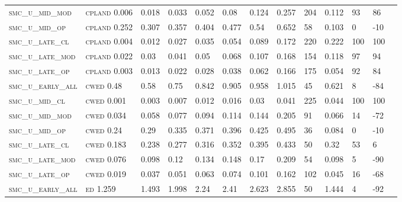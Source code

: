 \begin{landscape}
\begin{center}
\begin{footnotesize}
\begin{longtable}{lllllllllllll}
\textsc{smc\_u\_mid\_mod  } & \textsc{cpland    }   0.006    & 0.018    & 0.033    & 0.052    & 0.08     & 0.124    & 0.257    & 204  & 0.112    & 93  & 86   \\
\textsc{smc\_u\_mid\_op   } & \textsc{cpland    }   0.252    & 0.307    & 0.357    & 0.404    & 0.477    & 0.54     & 0.652    & 58   & 0.103    & 0   & -10  \\
\textsc{smc\_u\_late\_cl  } & \textsc{cpland    }   0.004    & 0.012    & 0.027    & 0.035    & 0.054    & 0.089    & 0.172    & 220  & 0.222    & 100 & 100  \\
\textsc{smc\_u\_late\_mod } & \textsc{cpland    }   0.022    & 0.03     & 0.041    & 0.05     & 0.068    & 0.107    & 0.168    & 154  & 0.118    & 97  & 94   \\
\textsc{smc\_u\_late\_op  } & \textsc{cpland    }   0.003    & 0.013    & 0.022    & 0.028    & 0.038    & 0.062    & 0.166    & 175  & 0.054    & 92  & 84   \\
\textsc{smc\_u\_early\_all} & \textsc{cwed      }   0.48     & 0.58     & 0.75     & 0.842    & 0.905    & 0.958    & 1.015    & 45   & 0.621    & 8   & -84  \\
\textsc{smc\_u\_mid\_cl   } & \textsc{cwed      }   0.001    & 0.003    & 0.007    & 0.012    & 0.016    & 0.03     & 0.041    & 225  & 0.044    & 100 & 100  \\
\textsc{smc\_u\_mid\_mod  } & \textsc{cwed      }   0.034    & 0.058    & 0.077    & 0.094    & 0.114    & 0.144    & 0.205    & 91   & 0.066    & 14  & -72  \\
\textsc{smc\_u\_mid\_op   } & \textsc{cwed      }   0.24     & 0.29     & 0.335    & 0.371    & 0.396    & 0.425    & 0.495    & 36   & 0.084    & 0   & -10  \\
\textsc{smc\_u\_late\_cl  } & \textsc{cwed      }   0.183    & 0.238    & 0.277    & 0.316    & 0.352    & 0.395    & 0.433    & 50   & 0.32     & 53  & 6    \\
\textsc{smc\_u\_late\_mod } & \textsc{cwed      }   0.076    & 0.098    & 0.12     & 0.134    & 0.148    & 0.17     & 0.209    & 54   & 0.098    & 5   & -90  \\
\textsc{smc\_u\_late\_op  } & \textsc{cwed      }   0.019    & 0.037    & 0.051    & 0.063    & 0.074    & 0.101    & 0.162    & 102  & 0.045    & 16  & -68  \\
\textsc{smc\_u\_early\_all} & \textsc{ed        }   1.259    & 1.493    & 1.998    & 2.24     & 2.41     & 2.623    & 2.855    & 50   & 1.444    & 4   & -92  \\

\end{longtable}
\end{footnotesize}
\end{center}
\end{landscape}
